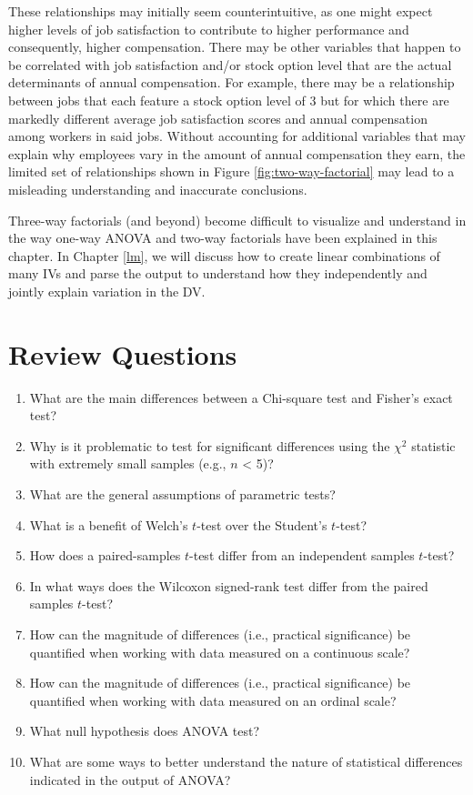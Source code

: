 \documentclass[
]{book}
\begin{document}
These relationships may initially seem counterintuitive, as one might expect higher levels of job satisfaction to contribute to higher performance and consequently, higher compensation. There may be other variables that happen to be correlated with job satisfaction and/or stock option level that are the actual determinants of annual compensation. For example, there may be a relationship between jobs that each feature a stock option level of 3 but for which there are markedly different average job satisfaction scores and annual compensation among workers in said jobs. Without accounting for additional variables that may explain why employees vary in the amount of annual compensation they earn, the limited set of relationships shown in Figure \ref{fig:two-way-factorial} may lead to a misleading understanding and inaccurate conclusions.

Three-way factorials (and beyond) become difficult to visualize and understand in the way one-way ANOVA and two-way factorials have been explained in this chapter. In Chapter \ref{lm}, we will discuss how to create linear combinations of many IVs and parse the output to understand how they independently and jointly explain variation in the DV.

\hypertarget{review-questions-7}{%
\section{Review Questions}\label{review-questions-7}}

\begin{enumerate}
\def\labelenumi{\arabic{enumi}.}
\item
  What are the main differences between a Chi-square test and Fisher's exact test?
\item
  Why is it problematic to test for significant differences using the \({\chi}^2\) statistic with extremely small samples (e.g., \(n\) \textless{} 5)?
\item
  What are the general assumptions of parametric tests?
\item
  What is a benefit of Welch's \(t\)-test over the Student's \(t\)-test?
\item
  How does a paired-samples \(t\)-test differ from an independent samples \(t\)-test?
\item
  In what ways does the Wilcoxon signed-rank test differ from the paired samples \(t\)-test?
\item
  How can the magnitude of differences (i.e., practical significance) be quantified when working with data measured on a continuous scale?
\item
  How can the magnitude of differences (i.e., practical significance) be quantified when working with data measured on an ordinal scale?
\item
  What null hypothesis does ANOVA test?
\item
  What are some ways to better understand the nature of statistical differences indicated in the output of ANOVA?
\end{enumerate}
\end{document}
